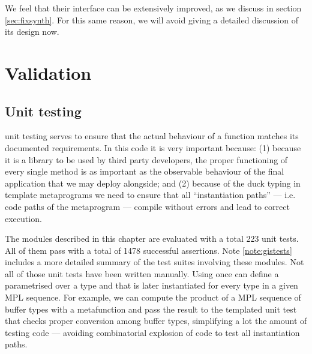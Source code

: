 We feel that their interface can be extensively improved, as
we discuss in section \ref{sec:fixsynth}. For this same reason, we
will avoid giving a detailed discussion of its design now.

\section{Validation}

\subsection{Unit testing}
\label{sec:sound-unittest}
unit testing serves to ensure that the actual behaviour of a function
matches its documented requirements. In this code it is very important
because: (1) because it is a library to be used by third party
developers, the proper functioning of every single method is as
important as the observable behaviour of the final application that we
may deploy alongside; and (2) because of the duck typing in template
metaprograms we need to ensure that all ``instantiation paths'' ---
i.e. code paths of the metaprogram --- compile without errors and lead
to correct execution.

The modules described in this chapter are evaluated with
a total 223 unit tests. All of them pass with a total of 1478
successful assertions. Note \ref{note:gistests} includes a more
detailed summary of the test suites involving these modules. Not all of
those unit tests have been written manually. Using
 once can define a parametrised over
a type and that is later instantiated for every type in a given MPL
sequence. For example, we can compute the product of a MPL sequence of
buffer types with a metafunction and pass the result to the templated
unit test that checks proper conversion among buffer types,
simplifying a lot the amount of testing code --- avoiding
combinatorial explosion of code to test all instantiation paths.

